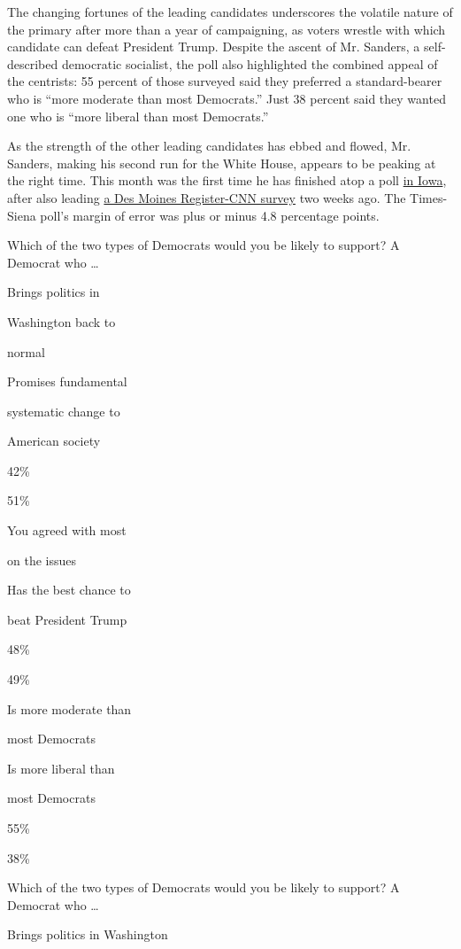 The changing fortunes of the leading candidates underscores the volatile
nature of the primary after more than a year of campaigning, as voters
wrestle with which candidate can defeat President Trump. Despite the
ascent of Mr. Sanders, a self-described democratic socialist, the poll
also highlighted the combined appeal of the centrists: 55 percent of
those surveyed said they preferred a standard-bearer who is ``more
moderate than most Democrats.'' Just 38 percent said they wanted one who
is ``more liberal than most Democrats.''

As the strength of the other leading candidates has ebbed and flowed,
Mr. Sanders, making his second run for the White House, appears to be
peaking at the right time. This month was the first time he has finished
atop a poll
\href{https://www.nytimes3xbfgragh.onion/live/2020/iowa-democratic-caucus-01-26/}{in
Iowa}, after also leading
\href{https://www.nytimes3xbfgragh.onion/2020/01/10/us/politics/des-moines-register-poll.html}{a
Des Moines Register-CNN survey} two weeks ago. The Times-Siena poll's
margin of error was plus or minus 4.8 percentage points.

Which of the two types of Democrats would you be likely to support? A
Democrat who \ldots{}

Brings politics in

Washington back to

normal

Promises fundamental

systematic change to

American society

42\%

51\%

You agreed with most

on the issues

Has the best chance to

beat President Trump

48\%

49\%

Is more moderate than

most Democrats

Is more liberal than

most Democrats

55\%

38\%

Which of the two types of Democrats would you be likely to support? A
Democrat who \ldots{}

Brings politics in Washington


